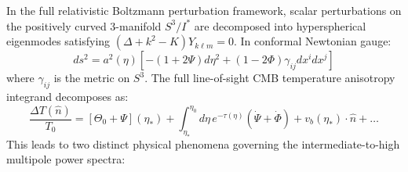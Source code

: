 \documentclass[11pt,a4paper]{article}
\theoremstyle{definition}
\begin{document}
In the full relativistic Boltzmann perturbation framework, scalar perturbations on the positively curved 3-manifold $S^3 / I^*$ are decomposed into hyperspherical eigenmodes satisfying $(\Delta + k^2 - K) Y_{k\ell m} = 0$. In conformal Newtonian gauge:
\begin{equation}
ds^2 = a^2(\eta) \left[ -(1 + 2\Psi) d\eta^2 + (1 - 2\Phi) \gamma_{ij} dx^i dx^j \right]
\end{equation}
where $\gamma_{ij}$ is the metric on $S^3$. The full line-of-sight CMB temperature anisotropy integrand decomposes as:
\begin{equation}
\frac{\Delta T(\hat{n})}{T_0} = \left[ \Theta_0 + \Psi \right](\eta_*) + \int_{\eta_*}^{\eta_0} d\eta \, e^{-\tau(\eta)} \left( \dot{\Psi} + \dot{\Phi} \right) + v_b(\eta_*) \cdot \hat{n} + \dots
\end{equation}
This leads to two distinct physical phenomena governing the intermediate-to-high multipole power spectra:
\end{document}
